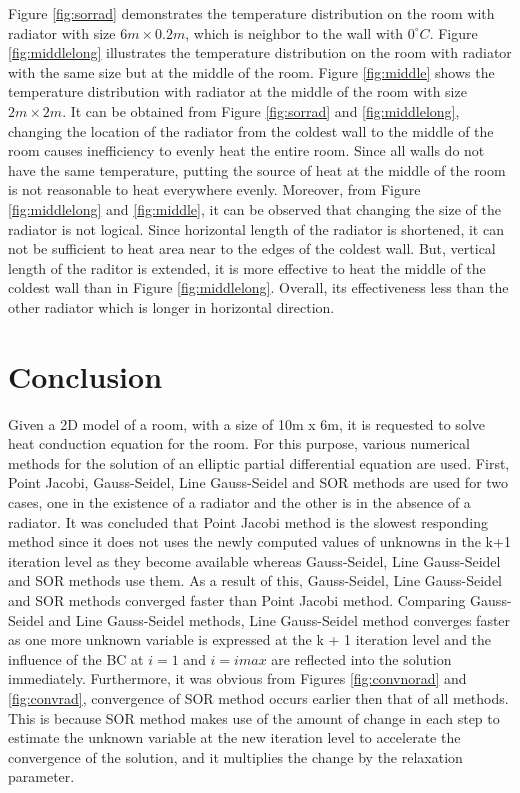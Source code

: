 \documentclass[letterpaper,12pt]{article}
\begin{document}
Figure \ref{fig:sorrad} demonstrates the temperature distribution
on the room with radiator with size $6m\times0.2m$, which is
neighbor to the wall with $0^\circ C$. Figure \ref{fig:middlelong} illustrates the
temperature distribution on the room with radiator with the same size but at
the middle of the room. Figure \ref{fig:middle} shows the temperature
distribution with radiator at the middle of the room with size $2m\times2m$.
It can be obtained from Figure \ref{fig:sorrad} and \ref{fig:middlelong},
changing the location of the radiator from the coldest wall to the middle
of the room causes inefficiency to evenly heat the entire room. Since all walls do not have
the same temperature, putting the source of heat at the middle of the room
is not reasonable to heat everywhere evenly. Moreover, from Figure \ref{fig:middlelong}
and \ref{fig:middle}, it can be observed that  changing the size of the radiator is
not logical. Since horizontal length of the radiator is shortened, it can not be
sufficient to heat area near to the edges of the coldest wall. But, vertical length
of the raditor is extended, it is more effective to heat the middle of the coldest
wall than in Figure \ref{fig:middlelong}. Overall, its effectiveness less than the other radiator
which is longer in horizontal direction.



\section{Conclusion}
Given a 2D model of a room, with a size of 10m x 6m, it is requested to solve heat conduction equation for
the room. For this purpose, various numerical methods for the solution of an elliptic partial differential
equation are used. First, Point Jacobi, Gauss-Seidel, Line Gauss-Seidel and SOR methods are used for two cases,
one in the existence of a radiator and the other is in the absence of a radiator. It was concluded that Point Jacobi method is the slowest responding method since it does not uses the newly computed values of unknowns in the k+1 iteration
level as they become available whereas Gauss-Seidel, Line Gauss-Seidel and SOR methods use them. As a result of this, Gauss-Seidel,
Line Gauss-Seidel and SOR methods converged faster than Point Jacobi method. Comparing Gauss-Seidel and Line Gauss-Seidel methods,
Line Gauss-Seidel method converges faster as one more unknown variable is expressed at the k + 1 iteration level and the influence
of the BC at $i = 1$ and $i = imax$ are reflected into the solution immediately. Furthermore, it was obvious
from Figures \ref{fig:convnorad} and \ref{fig:convrad}, convergence of SOR method occurs earlier then
that of all methods. This is because SOR method makes use of the amount of change in each step to 
estimate the unknown variable at the new iteration level to accelerate the convergence of the solution, and
it multiplies the change by the relaxation parameter.
\end{document}
